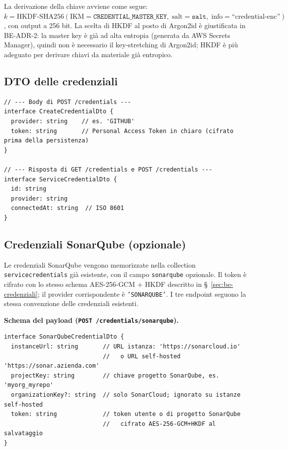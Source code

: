 \documentclass[11pt,a4paper]{article}
\begin{document}
La derivazione della chiave avviene come segue: $k = \text{HKDF-SHA256}(\text{IKM}=\texttt{CREDENTIAL\_MASTER\_KEY},\; \text{salt}=\texttt{salt},\; \text{info}=\text{``credential-enc''})$, con output a 256 bit. La scelta di HKDF al posto di Argon2id è giustificata in BE-ADR-2: la master key è già ad alta entropia (generata da AWS Secrets Manager), quindi non è necessario il key-stretching di Argon2id; HKDF è più adeguato per derivare chiavi da materiale già entropico.

\subsection{DTO delle credenziali}

\begin{lstlisting}[caption={DTO esposti al frontend per la gestione delle credenziali.}]
// --- Body di POST /credentials ---
interface CreateCredentialDto {
  provider: string    // es. 'GITHUB'
  token: string       // Personal Access Token in chiaro (cifrato prima della persistenza)
}

// --- Risposta di GET /credentials e POST /credentials ---
interface ServiceCredentialDto {
  id: string
  provider: string
  connectedAt: string  // ISO 8601
}
\end{lstlisting}

\subsection{Credenziali SonarQube (opzionale)}
\label{ssec:be-credenziali-sonarqube}

Le credenziali SonarQube vengono memorizzate nella collection \texttt{servicecredentials} già esistente, con il campo \texttt{sonarqube} opzionale. Il token è cifrato con lo stesso schema AES-256-GCM + HKDF descritto in \S~\ref{sec:be-credenziali}; il provider corrispondente è \texttt{'SONARQUBE'}. I tre endpoint seguono la stessa convenzione delle credenziali esistenti.

\noindent\textbf{Schema del payload (\texttt{POST /credentials/sonarqube}).}

\begin{lstlisting}[caption={DTO per la configurazione delle credenziali SonarQube.}]
interface SonarQubeCredentialDto {
  instanceUrl: string       // URL istanza: 'https://sonarcloud.io'
                            //   o URL self-hosted 'https://sonar.azienda.com'
  projectKey: string        // chiave progetto SonarQube, es. 'myorg_myrepo'
  organizationKey?: string  // solo SonarCloud; ignorato su istanze self-hosted
  token: string             // token utente o di progetto SonarQube
                            //   cifrato AES-256-GCM+HKDF al salvataggio
}
\end{lstlisting}
\end{document}
